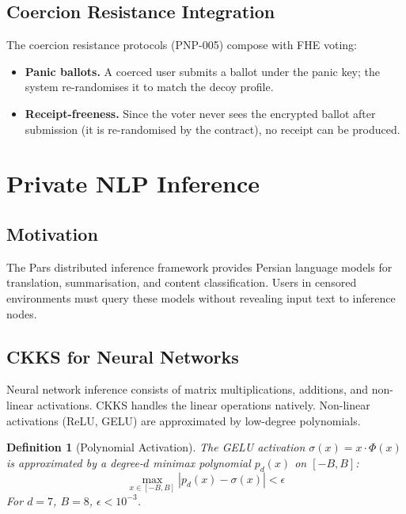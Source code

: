 \documentclass[11pt,a4paper]{article}
\newtheorem{definition}{Definition}[section]
\begin{document}
\subsection{Coercion Resistance Integration}

The coercion resistance protocols (PNP-005) compose with FHE voting:

\begin{itemize}
    \item \textbf{Panic ballots.}  A coerced user submits a ballot under
    the panic key; the system re-randomises it to match the decoy
    profile.
    \item \textbf{Receipt-freeness.}  Since the voter never sees the
    encrypted ballot after submission (it is re-randomised by the
    contract), no receipt can be produced.
\end{itemize}

\section{Private NLP Inference}
\label{sec:nlp}

\subsection{Motivation}

The Pars distributed inference framework provides Persian language models
for translation, summarisation, and content classification.  Users in
censored environments must query these models without revealing input text
to inference nodes.

\subsection{CKKS for Neural Networks}

Neural network inference consists of matrix multiplications, additions,
and non-linear activations.  CKKS handles the linear operations natively.
Non-linear activations (ReLU, GELU) are approximated by low-degree
polynomials.

\begin{definition}[Polynomial Activation]
    The GELU activation $\sigma(x) = x \cdot \Phi(x)$ is approximated by
    a degree-$d$ minimax polynomial $p_d(x)$ on $[-B, B]$:
    \[
        \max_{x \in [-B,B]} |p_d(x) - \sigma(x)| < \epsilon
    \]
    For $d = 7$, $B = 8$, $\epsilon < 10^{-3}$.
\end{definition}
\end{document}
